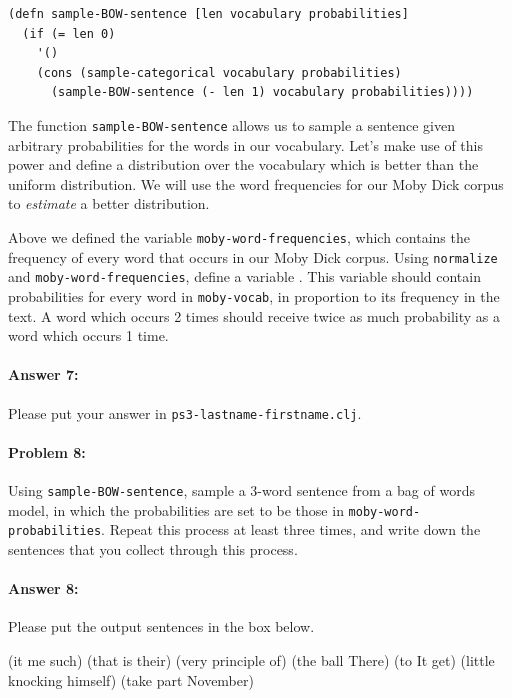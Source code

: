 \documentclass[10pt]{article}
\newenvironment{AnswerBox}{\begin{mdframed}[style=simple]}{\end{mdframed}}
\newcommand{\required}[1]{{\color{blue}{#1}}}
\newcommand{\PSnum}{3}
\begin{document}
\begin{lstlisting}
(defn sample-BOW-sentence [len vocabulary probabilities]
  (if (= len 0)
    '()
    (cons (sample-categorical vocabulary probabilities)
	  (sample-BOW-sentence (- len 1) vocabulary probabilities))))
\end{lstlisting}

The function \texttt{sample-BOW-sentence} allows us to sample a
sentence given arbitrary probabilities for the words in our
vocabulary. Let's make use of this power and define a distribution
over the vocabulary which is better than the uniform distribution. We
will use the word frequencies for our Moby Dick corpus to
\emph{estimate} a better distribution.

Above we defined the variable \texttt{moby-word-frequencies}, which
contains the frequency of every word that occurs in our Moby Dick
corpus. Using \texttt{normalize} and \texttt{moby-word-frequencies},
define a variable \required{\texttt{moby-word-probabilities}}. This variable
should contain probabilities for every word in \texttt{moby-vocab}, in
proportion to its frequency in the text. A word which occurs 2 times
should receive twice as much probability as a word which occurs 1
time.

\paragraph{Answer 7:} Please put your answer in
\texttt{ps\PSnum-lastname-firstname.clj}.

\hrulefill %

\paragraph{Problem 8:}

Using \texttt{sample-BOW-sentence}, sample a 3-word sentence from a
bag of words model, in which the probabilities are set to be those in
\texttt{moby-word-probabilities}. Repeat this process at least three
times, and write down the sentences that you collect through this
process.

\paragraph{Answer 8:} Please put the output sentences in the box below.

\begin{AnswerBox}%

   (it me such)
   (that is their)
   (very principle of)
   (the ball There)
   (to It get)
   (little knocking himself)
   (take part November)

\end{AnswerBox}%
\end{document}
